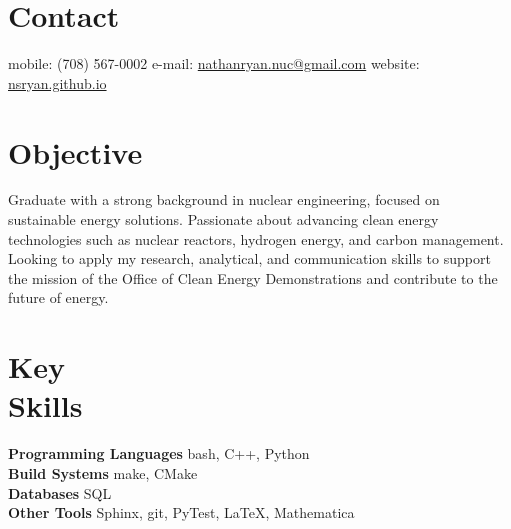 \documentclass[margin,line]{resume}
\begin{document}
\begin{resume}

%


    \section{\mysidestyle Contact}
    mobile: (708) 567-0002 \hfill e-mail: \href{mailto:nathanryan.nuc@gmail.com}{nathanryan.nuc@gmail.com} \hfill website: \href{https://nsryan.github.io}{nsryan.github.io} \vspace{0mm}\\\vspace{1mm}%

    \vspace{-6mm}
    \section{\mysidestyle Objective}
        Graduate with a strong background in nuclear engineering, focused on sustainable energy solutions. Passionate about advancing clean energy technologies such as nuclear reactors, hydrogen energy, and carbon management. Looking to apply my research, analytical, and communication skills to support the mission of the Office of Clean Energy Demonstrations and contribute to the future of energy.

    \section{\mysidestyle Key\\Skills}
        \textbf{Programming Languages} \hfill bash, C++, Python\vspace{.5mm}\\%
        \textbf{Build Systems} \hfill make, CMake\vspace{.5mm}\\%
        \textbf{Databases} \hfill SQL\vspace{.5mm}\\%
        \textbf{Other Tools} \hfill Sphinx, git, PyTest, \LaTeX, Mathematica\vspace{.5mm}%

\end{resume}
\end{document}
